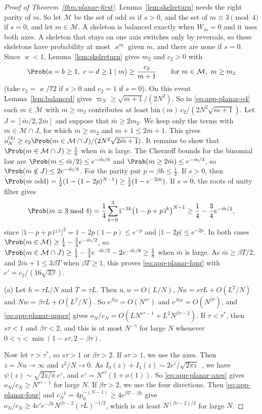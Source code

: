 \begin{proof}[Proof of Theorem~\ref{thm:planar-first}]
Lemma~\ref{lem:skelreturn} needs the right parity of $m$. So let $\mathcal M$ be the set of odd
$m$ if $s>0$, and the set of $m\equiv3\pmod4$ if $s=0$, and let $m\in\mathcal M$. A skeleton is
balanced exactly when $W_m=0$ and it uses both axes. A skeleton that stays on one axis switches
only by reversals, so these skeletons have probability at most $\varkappa^m$ given $m$, and there
are none if $s=0$. Since $\varkappa<1$, Lemma~\ref{lem:skelreturn} gives $m_2$ and $c_2>0$ with
\[
 \Prob(a=b\ge1,\ c=d\ge1\mid m)\ge\frac{c_2}{m+1}\qquad\text{for }m\in\mathcal M,\ m\ge m_2
\]
(take $c_2=\varkappa/72$ if $s>0$ and $c_2=1$ if $s=0$). On this event Lemma~\ref{lem:balanced}
gives $\varpi_N\ge\sqrt{m+1}/(2N^2)$. So in \eqref{eq:app-planar-o4} each $m\in\mathcal M$ with
$m\ge m_2$ contributes at least $\mathrm{bin}(m)\,c_2/(2N^2\sqrt{m+1})$. Let
$J=[\bar m/2,2\bar m]$ and suppose that $\bar m\ge2m_2$. We keep only the terms with
$m\in\mathcal M\cap J$, for which $m\ge m_2$ and $m+1\le2\bar m+1$. This gives
$o^{(4)}_N\ge c_2\Prob(m\in\mathcal M\cap J)/(2N^2\sqrt{2\bar m+1})$.
It remains to show that $\Prob(m\in\mathcal M\cap J)\ge\frac18$ when $\bar m$ is large. The
Chernoff bounds for the binomial law are $\Prob(m\le\bar m/2)\le e^{-\bar m/8}$ and
$\Prob(m\ge2\bar m)\le e^{-\bar m/3}$, so $\Prob(m\notin J)\le2e^{-\bar m/8}$. For the parity put
$p=\beta h\le\frac12$. If $s>0$, then
$\Prob(m\text{ odd})=\frac12(1-(1-2p)^{N-1})\ge\frac12(1-e^{-2\bar m})$. If $s=0$, the roots of
unity filter gives
\[
 \Prob(m\equiv3\bmod4)=\frac14\sum_{k=0}^3\mathrm i^{-3k}\bigl(1-p+p\,\mathrm i^k\bigr)^{N-1}
 \ge\frac14-\frac34e^{-\bar m/2},
\]
since $\lvert1-p+p\,\mathrm i^{\pm1}\rvert^2=1-2p(1-p)\le e^{-p}$ and $\lvert1-2p\rvert\le e^{-2p}$.
In both cases $\Prob(m\in\mathcal M)\ge\frac14-\frac34e^{-\bar m/2}$, so
$\Prob(m\in\mathcal M\cap J)\ge\frac14-\frac34e^{-\bar m/2}-2e^{-\bar m/8}\ge\frac18$ when
$\bar m$ is large. As $\bar m\ge\beta T/2$, and
$2\bar m+1\le3\beta T$ when $\beta T\ge1$, this proves \eqref{eq:app-planar-four} with
$c'=c_2/(16\sqrt{3\beta})$.

(a) Let $h=\tau L/N$ and $T=\tau L$. Then $u,w=O(L/N)$, $Nu=s\tau L+O(L^2/N)$ and
$Nw=\beta\tau L+O(L^2/N)$. So $e^{Nu}=O(N^{s\tau})$ and $e^{Nw}=O(N^{\beta\tau})$, and
\eqref{eq:app-planar-upper} gives $o_N/c_N=O(LN^{s\tau-1}+L^2N^{\beta\tau-2})$.
If $\tau<\tau^*$, then $s\tau<1$ and $\beta\tau<2$,
and this is at most $N^{-\gamma}$ for large $N$ whenever $0<\gamma<\min(1-s\tau,2-\beta\tau)$.

Now let $\tau>\tau^*$, so $s\tau>1$ or $\beta\tau>2$. If $s\tau>1$, we use the axes. Then
$z=Nu\to\infty$ and $z^2/N\to0$. As
$I_0(z)+I_1(z)\sim2e^z/\sqrt{2\pi z}$~\cite[Eq.~10.40.1]{dlmf}, we have
$\psi(z)\sim\sqrt{2z/\pi}\,e^z$, and $e^z=N^{s\tau}(1+o(1))$. So \eqref{eq:app-planar-axes} gives
$o_N/c_N\ge N^{s\tau-1}$ for large $N$. If $\beta\tau>2$, we use the four directions. Then
\eqref{eq:app-planar-four} and
$c_N^{-1}=4p_0^{-(N-1)}\ge4e^{\beta T-\beta h}$ give
$o_N/c_N\ge4c'e^{-\beta h}N^{\beta\tau-2}(\tau L)^{-1/2}$, which is at least $N^{(\beta\tau-2)/2}$
for large $N$.


\end{proof}

